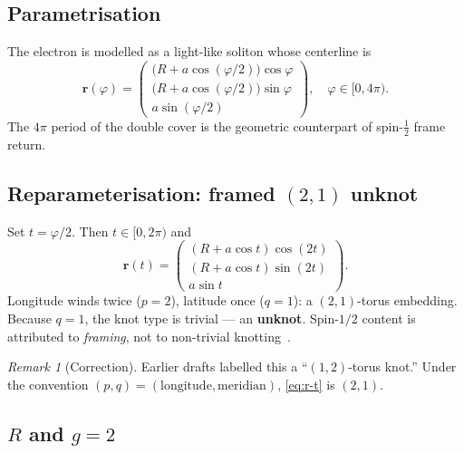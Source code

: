 \documentclass[11pt,a4paper]{article}
\theoremstyle{definition}
\theoremstyle{remark}
\newtheorem{remark}{Remark}[section]
\begin{document}
\subsection{Parametrisation}

The electron is modelled as a light-like soliton whose centerline is
\begin{equation}
\label{eq:r-phi}
\mathbf{r}(\varphi)
=
\begin{pmatrix}
\bigl(R + a\cos(\varphi/2)\bigr)\cos\varphi \\[4pt]
\bigl(R + a\cos(\varphi/2)\bigr)\sin\varphi \\[4pt]
a\sin(\varphi/2)
\end{pmatrix},
\quad \varphi\in[0,4\pi).
\end{equation}
The $4\pi$ period of the double cover is the geometric counterpart of
spin-$\tfrac12$ frame return.

\subsection{Reparameterisation: framed $(2,1)$ unknot}

Set $t=\varphi/2$.  Then $t\in[0,2\pi)$ and
\begin{equation}
\label{eq:r-t}
\mathbf{r}(t)
=
\begin{pmatrix}
(R + a\cos t)\cos(2t) \\[4pt]
(R + a\cos t)\sin(2t) \\[4pt]
a\sin t
\end{pmatrix}.
\end{equation}
Longitude winds twice ($p=2$), latitude once ($q=1$): a
$(2,1)$-torus embedding.  Because $q=1$, the knot type is trivial --- an
\textbf{unknot}.  Spin-$1/2$ content is attributed to \emph{framing}, not
to non-trivial knotting~\cite{Mobius2026}.

\begin{remark}[Correction]
Earlier drafts labelled this a ``$(1,2)$-torus knot.''  Under the
convention $(p,q)=(\mathrm{longitude},\mathrm{meridian})$,
\eqref{eq:r-t} is $(2,1)$.
\end{remark}

\subsection{$R$ and $g=2$}
\end{document}
